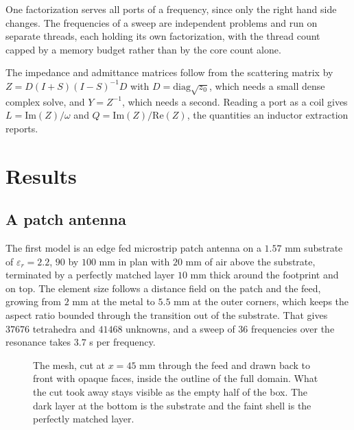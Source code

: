 \documentclass[11pt]{article}
\begin{document}
One factorization serves all ports of a frequency, since only the right hand
side changes. The frequencies of a sweep are independent problems and run on
separate threads, each holding its own factorization, with the thread count
capped by a memory budget rather than by the core count alone.

The impedance and admittance matrices follow from the scattering matrix by
\(Z = D(I+S)(I-S)^{-1}D\) with \(D = \mathrm{diag}\sqrt{z_0}\), which needs a
small dense complex solve, and \(Y = Z^{-1}\), which needs a second. Reading
a port as a coil gives \(L = \mathrm{Im}(Z)/\omega\) and
\(Q = \mathrm{Im}(Z)/\mathrm{Re}(Z)\), the quantities an inductor extraction
reports.

\section{Results}
\label{sec:results}

\subsection{A patch antenna}

The first model is an edge fed microstrip patch antenna on a
\(1.57\) mm substrate of \(\varepsilon_r = 2.2\), \(90\) by
\(100\) mm in plan with \(20\) mm of air above the substrate, terminated
by a perfectly matched layer \(10\) mm thick around the footprint and on
top. The element size follows a distance field on the patch and the feed,
growing from \(2\) mm at the metal to \(5.5\) mm at the outer corners,
which keeps the aspect ratio bounded through the transition out of the
substrate. That gives \(37676\) tetrahedra and \(41468\) unknowns, and a
sweep of 36 frequencies over the resonance takes \(3.7\) s per frequency.

\begin{figure}[H]
\centering
\begin{tikzpicture}

\end{tikzpicture}
\caption{The mesh, cut at \(x = 45\) mm through the feed and drawn back to
front with opaque faces, inside the outline of the full domain. What the cut
took away stays visible as the empty half of the box. The dark layer at the
bottom is the substrate and the faint shell is the perfectly matched
layer.}
\label{fig:patchmesh}
\end{figure}
\end{document}
